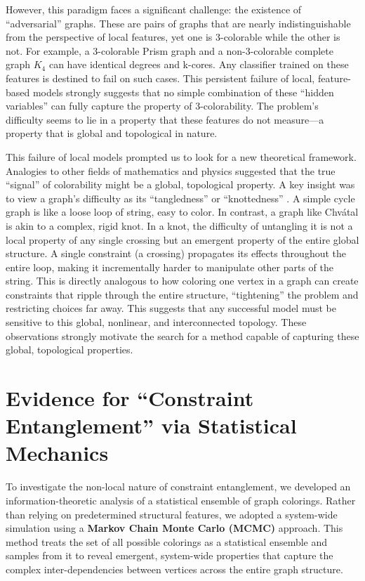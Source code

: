 \documentclass[12pt, letterpaper]{article}
\begin{document}
However, this paradigm faces a significant challenge: the existence of ``adversarial'' graphs. These are pairs of graphs that are nearly indistinguishable from the perspective of local features, yet one is 3-colorable while the other is not. For example, a 3-colorable Prism graph and a non-3-colorable complete graph $K_4$ can have identical degrees and k-cores. Any classifier trained on these features is destined to fail on such cases. This persistent failure of local, feature-based models strongly suggests that no simple combination of these ``hidden variables'' can fully capture the property of 3-colorability. The problem's difficulty seems to lie in a property that these features do not measure—a property that is global and topological in nature.

This failure of local models prompted us to look for a new theoretical framework. Analogies to other fields of mathematics and physics suggested that the true ``signal'' of colorability might be a global, topological property. A key insight was to view a graph's difficulty as its ``tangledness'' or ``knottedness'' \cite{welsh1993complexity}. A simple cycle graph is like a loose loop of string, easy to color. In contrast, a graph like Chvátal is akin to a complex, rigid knot. In a knot, the difficulty of untangling it is not a local property of any single crossing but an emergent property of the entire global structure. A single constraint (a crossing) propagates its effects throughout the entire loop, making it incrementally harder to manipulate other parts of the string. This is directly analogous to how coloring one vertex in a graph can create constraints that ripple through the entire structure, ``tightening'' the problem and restricting choices far away. This suggests that any successful model must be sensitive to this global, nonlinear, and interconnected topology. These observations strongly motivate the search for a method capable of capturing these global, topological properties.

\section{Evidence for ``Constraint Entanglement'' via Statistical Mechanics}

To investigate the non-local nature of constraint entanglement, we developed an information-theoretic analysis of a statistical ensemble of graph colorings. Rather than relying on predetermined structural features, we adopted a system-wide simulation using a \textbf{Markov Chain Monte Carlo (MCMC)} approach. This method treats the set of all possible colorings as a statistical ensemble and samples from it to reveal emergent, system-wide properties that capture the complex inter-dependencies between vertices across the entire graph structure.
\end{document}
